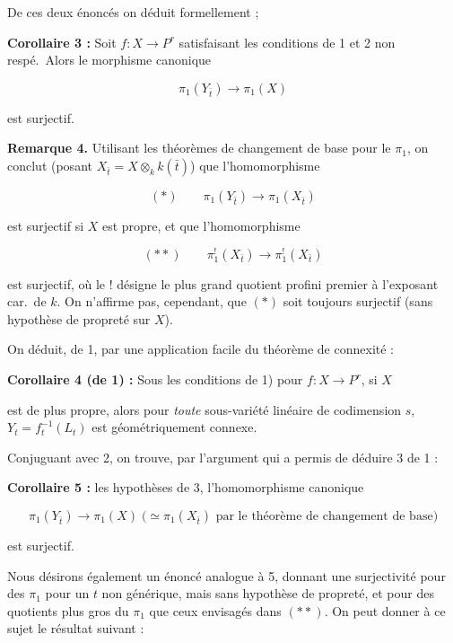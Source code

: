 \documentclass[11pt,a4paper]{article}
\begin{document}
De ces deux énoncés on déduit formellement ;

\textbf{ Corollaire 3 :} Soit $f : X \to P^{r}$ satisfaisant
les conditions de 1 et 2  non respé.\ Alors
 le morphisme canonique

\[ \pi_{1}(Y_{\bar{t}}) \longrightarrow \pi_{1}(X) \]

est surjectif.

\textbf{Remarque 4.} Utilisant les théorèmes de changement de base pour le
$\pi_{1}$, on conclut  (posant $X_{\bar{t}} = X \otimes_{k}
k(\bar{t})$) que l'homomorphisme

\begin{equation*}
(*) \qquad \pi_{1}(Y_{\bar{t}}) \longrightarrow \pi_{1}(X_{\bar{t}})
\end{equation*}

est surjectif si $X$ est propre, et que l'homomorphisme

\begin{equation*}
(**) \qquad \pi_{1}^{!}(X_{\bar{t}}) \longrightarrow \pi_{1}^{!}(X_{\bar{t}})
\end{equation*}

est surjectif, où le $!$ désigne le plus grand quotient profini premier à
l'exposant car.\ de $k$. On n'affirme pas, cependant, que $(*)$ soit toujours
surjectif (sans hypothèse de propreté sur $X$).

On déduit, de 1, par une application facile du théorème de connexité :

\textbf{Corollaire 4 (de 1) :} Sous les conditions de 1) pour $f : X \to P^{r}$,
si $X$


est de plus propre, alors pour \emph{toute} sous-variété linéaire 
de codimension $s$, $Y_{t} = f_{t}^{-1}(L_{t})$ est géométriquement connexe.

Conjuguant avec 2, on trouve, par l'argument qui a permis de déduire 3 de 1 :

\textbf{Corollaire 5 :}   les hypothèses de 3,
 l'homomorphisme canonique

\[ \pi_{1}(Y_{\bar{t}}) \longrightarrow \pi_{1}(X) \; \big(\simeq
\pi_{1}(X_{\bar{t}}) \text{ par le théorème de changement de base}\big) \]

est surjectif.


Nous désirons également un énoncé analogue à 5, donnant une surjectivité pour
des $\pi_{1}$ pour un $t$ non générique, mais sans hypothèse de propreté, et
pour des quotients plus gros du $\pi_{1}$ que ceux envisagés dans $(**)$. On
peut donner à ce sujet le résultat suivant :
\end{document}
